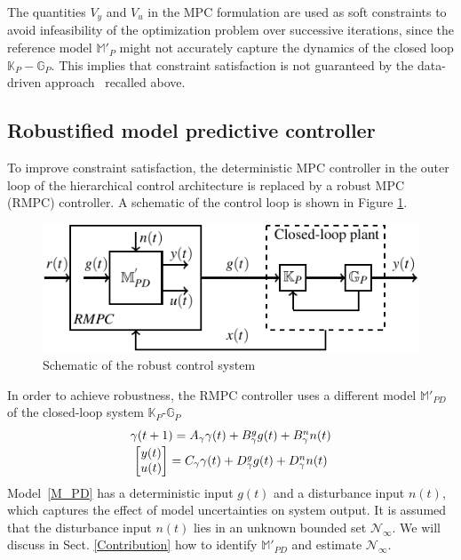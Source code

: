 \documentclass[letterpaper, 10 pt, conference]{ieeeconf}  %
\newcommand{\AB}[1]{\textbf{\color{magenta}{[AB: #1]}}}
\begin{document}
	\normalsize
	The quantities $V_y$ and $V_u$ in the MPC formulation are used as soft constraints to avoid infeasibility of the optimization problem over successive iterations, since the reference model $\mathbb{M}'_P$ might not accurately capture the dynamics of the closed loop $\mathbb{K}_P-\mathbb{G}_P$. This implies that constraint satisfaction is not guaranteed by the data-driven approach~\cite{7932940} recalled above. 
	
	\subsection{Robustified model predictive controller}

	To improve constraint satisfaction, the deterministic MPC controller in the outer loop of the hierarchical control architecture is replaced by a robust MPC (RMPC) controller. A schematic of the control loop is shown in Figure \ref{fullloop}. 
	\begin{figure}[t]
		\vspace{-3pt}
		\hspace{20pt}
		\includegraphics[scale = 0.9]{final_robust.pdf}
		\caption{Schematic of the robust control system}
		\label{fullloop}
	\end{figure} 
	
	In order to achieve robustness, the RMPC controller uses a different model $\mathbb{M}'_{PD}$ of the closed-loop system $\mathbb{K}_P$-$\mathbb{G}_P$
	\begin{equation}
	\begin{matrix}
	\gamma(t+1) = A_\gamma\gamma(t) + B^g_\gamma g(t) + B^n_\gamma n(t) \vspace{2pt}\\
	\begin{bmatrix}y(t)\\u(t)\end{bmatrix} = C_\gamma\gamma(t) + D^g_\gamma g(t) + D^n_\gamma n(t)
	\end{matrix}
	\label{M_PD}
	\end{equation}
Model~\eqref{M_PD} has a deterministic input $g(t)$ and a disturbance input $n(t)$, which captures the effect of model uncertainties on system output. It is assumed that the disturbance input $n(t)$ lies in an unknown bounded set $\mathcal{N}_{\infty}$.
We will discuss in Sect. \ref{Contribution}
how to identify $\mathbb{M}'_{PD}$ and estimate $\mathcal{N}_{\infty}$.
\end{document}
